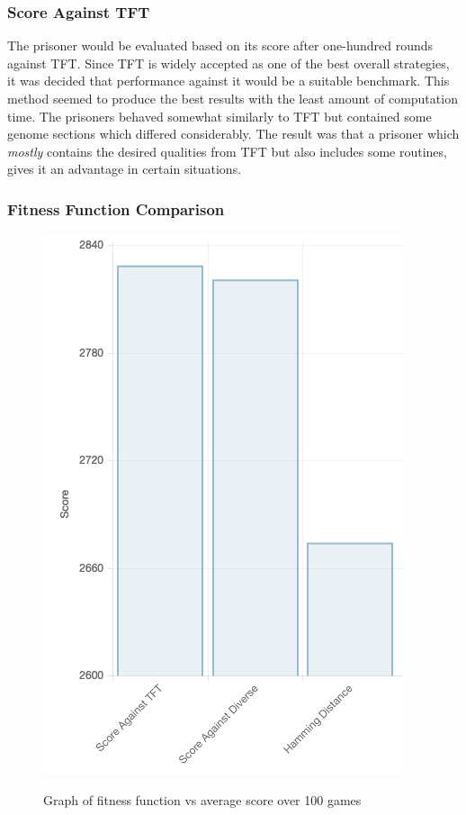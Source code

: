 \documentclass[12pt]{article}
\begin{document}
\subsubsection{Score Against TFT}
\label{tft}

The prisoner would be evaluated based on its score after one-hundred rounds against
TFT.  Since TFT is widely accepted as one of the best overall strategies, it was
decided that performance against it would be a suitable benchmark.
This method seemed to produce the best results with the least
amount of computation time.  The prisoners behaved somewhat similarly
to TFT but contained some genome sections which differed considerably.  The result was that a prisoner which \textit{mostly} contains the desired qualities from TFT
but also includes some routines, gives it an advantage in certain situations.


\subsubsection{Fitness Function Comparison}

\begin{figure}[h]
    \label{fig2}
    \centering
    \includegraphics[scale=0.5]{figures/fit_score.png}
    \label{fig1}
    \caption{Graph of fitness function vs average score over 100 games}
\end{figure}
\end{document}

